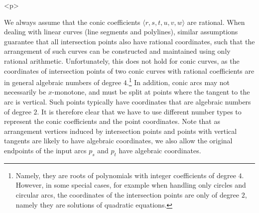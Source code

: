\begin{ccHtmlOnly}<p>\end{ccHtmlOnly}
We always assume that the conic coefficients $\langle r, s,
t, u, v, w \rangle$ are rational. When dealing with linear curves
(line segments and polylines), similar assumptions guarantee that
all intersection points also have rational coordinates, such that
the arrangement of such curves can be constructed and maintained
using only rational arithmetic. Unfortunately, this does not hold
for conic curves, as the coordinates of intersection points of two
conic curves with rational coefficients are in general algebraic
numbers of degree $4$.\footnote{Namely, they are roots of
polynomials with integer coefficients of degree $4$. However, in
some special cases, for example when handling only circles and
circular arcs, the coordinates of the intersection points are only
of degree $2$, namely they are solutions of quadratic equations.}
In addition, conic arcs may not necessarily be $x$-monotone, and
must be split at points where the tangent to the arc is vertical.
Such points typically have coordinates that are algebraic numbers
of degree $2$.
It is therefore clear that we have to use different number types
to represent the conic coefficients and the point coordinates.
Note that as arrangement vertices induced by intersection points
and points with vertical tangents are likely to have algebraic
coordinates, we also allow the original endpoints of the input arcs
$p_s$ and $p_t$ have algebraic coordinates.

